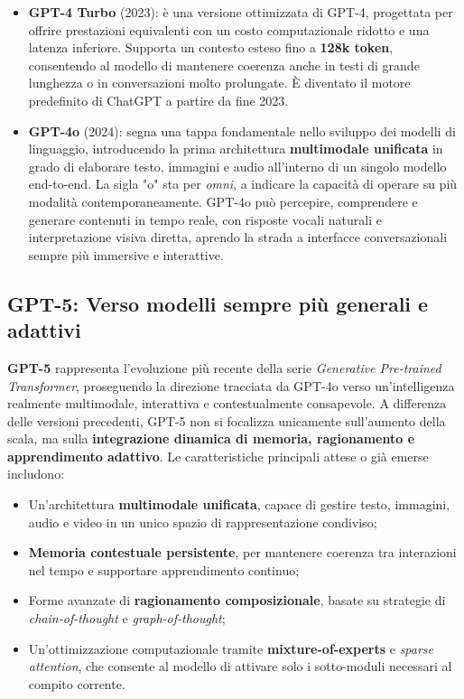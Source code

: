 \begin{itemize}
    \item \textbf{GPT-4 Turbo} (2023): è una versione ottimizzata di GPT-4, progettata per offrire prestazioni equivalenti con un costo computazionale ridotto e una latenza inferiore. Supporta un contesto esteso fino a \textbf{128k token}, consentendo al modello di mantenere coerenza anche in testi di grande lunghezza o in conversazioni molto prolungate. È diventato il motore predefinito di ChatGPT a partire da fine 2023.

    \item \textbf{GPT-4o} (2024): segna una tappa fondamentale nello sviluppo dei modelli di linguaggio, introducendo la prima architettura \textbf{multimodale unificata} in grado di elaborare testo, immagini e audio all’interno di un singolo modello end-to-end. La sigla "o" sta per \textit{omni}, a indicare la capacità di operare su più modalità contemporaneamente. GPT-4o può percepire, comprendere e generare contenuti in tempo reale, con risposte vocali naturali e interpretazione visiva diretta, aprendo la strada a interfacce conversazionali sempre più immersive e interattive.
\end{itemize}

\subsection{GPT-5: Verso modelli sempre più generali e adattivi}

\textbf{GPT-5} rappresenta l’evoluzione più recente della serie \textit{Generative Pre-trained Transformer}, proseguendo la direzione tracciata da GPT-4o verso un'intelligenza realmente multimodale, interattiva e contestualmente consapevole. A differenza delle versioni precedenti, GPT-5 non si focalizza unicamente sull’aumento della scala, ma sulla \textbf{integrazione dinamica di memoria, ragionamento e apprendimento adattivo}. Le caratteristiche principali attese o già emerse includono:
\begin{itemize}
    \item Un’architettura \textbf{multimodale unificata}, capace di gestire testo, immagini, audio e video in un unico spazio di rappresentazione condiviso;
    \item \textbf{Memoria contestuale persistente}, per mantenere coerenza tra interazioni nel tempo e supportare apprendimento continuo;
    \item Forme avanzate di \textbf{ragionamento composizionale}, basate su strategie di \textit{chain-of-thought} e \textit{graph-of-thought};
    \item Un’ottimizzazione computazionale tramite \textbf{mixture-of-experts} e \textit{sparse attention}, che consente al modello di attivare solo i sotto-moduli necessari al compito corrente.
\end{itemize}

